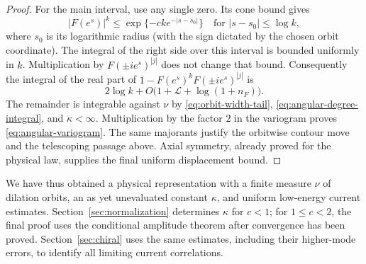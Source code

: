 \begin{proof}
For the main interval, use any single zero.  Its cone bound gives
\[
 |F(e^s)|^k\le
 \exp\{-c k e^{-|s-s_0|}\}
 \quad\text{for } |s-s_0|\le\log k,
\]
where $s_0$ is its logarithmic radius (with the sign dictated by the
chosen orbit coordinate).  The integral of the right side over this
interval is bounded uniformly in $k$.  Multiplication by
$F(\pm i e^s)^{|j|}$ does not change that bound.  Consequently the
integral of the real part of $1-F(e^s)^kF(\pm i e^s)^{|j|}$ is
\[
 2\log k+O\bigl(1+\mathcal L+\log(1+n_F)\bigr).
\]
The remainder is integrable against $\nu$ by
\eqref{eq:orbit-width-tail}, \eqref{eq:angular-degree-integral}, and
$\kappa<\infty$.  Multiplication by the factor $2$ in the variogram
proves \eqref{eq:angular-variogram}.  The same majorants justify the
orbitwise contour move and the telescoping passage above.  Axial
symmetry, already proved for the physical law, supplies the final
uniform displacement bound.
\end{proof}

We have thus obtained a physical representation with a finite measure
$\nu$ of dilation orbits, an as yet unevaluated constant $\kappa$, and
uniform low-energy current estimates. Section~\ref{sec:normalization}
determines $\kappa$ for $c<1$; for $1\le c<2$, the final proof uses the
conditional amplitude theorem after convergence has been proved.
Section~\ref{sec:chiral} uses the same estimates,
including their higher-mode errors, to identify all limiting current
correlations.
